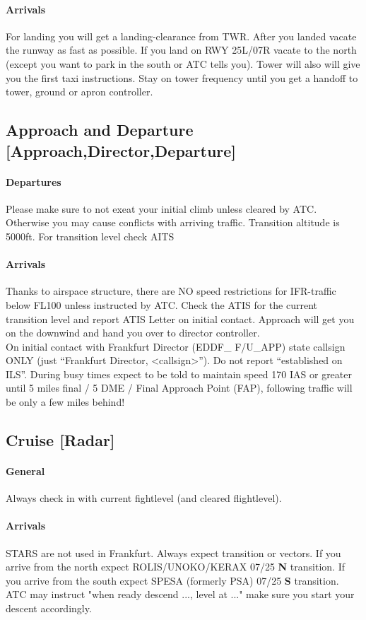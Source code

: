\paragraph{Arrivals}
For landing you will get a landing-clearance from TWR.
After you landed vacate the runway as fast as possible.
If you land on RWY 25L/07R vacate to the north (except you want to park in the south or ATC tells you).
Tower will also will give you the first taxi instructions.
Stay on tower frequency until you get a handoff to tower, ground or apron controller.

\subsection[APP]{Approach and Departure [Approach,Director,Departure]}
\paragraph{Departures}
Please make sure to not exeat your initial climb unless cleared by ATC.
Otherwise you may cause conflicts with arriving traffic.
Transition altitude is 5000ft. For transition level check AITS

\paragraph{Arrivals}
Thanks to airspace structure, there are NO speed restrictions for IFR-traffic below FL100 unless
instructed by ATC.
Check the ATIS for the current transition level and report ATIS Letter on initial contact.
Approach will get you on the downwind and hand you over to director controller.\\
On initial contact with Frankfurt Director (EDDF\_ F/U\_APP) state callsign ONLY (just “Frankfurt Director, <callsign>”).
Do not report “established on ILS”. During busy times expect to be told to maintain speed 170 IAS or greater until 5 miles final / 5 DME / Final Approach Point (FAP), following traffic will be only a few miles behind! 

\subsection[CTR]{Cruise [Radar]}
\paragraph{General}
Always check in with current fightlevel (and cleared flightlevel).

\paragraph{Arrivals}
STARS are not used in Frankfurt. Always expect transition or vectors.
If you arrive from the north expect ROLIS/UNOKO/KERAX 07/25 \textbf{N} transition.
If you arrive from the south expect SPESA (formerly PSA) 07/25 \textbf{S} transition.
ATC may instruct "when ready descend ..., level at ..." make sure you start your descent accordingly.
